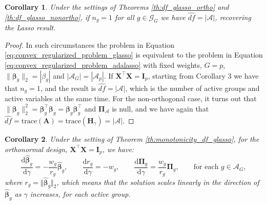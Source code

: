 \documentclass[a4paper, 12pt]{article}
\newcommand{\Aset}{\mathcal{A}}
\newcommand{\betahat}{\widehat{\boldsymbol\beta}}
\newcommand{\trace}{\mathrm{trace}}
\newcommand{\T}{\top}
\def\bbeta{\boldsymbol{\beta}}
\def\bPi{\boldsymbol{\Pi}}
\def\bA{\mathbf{A}}
\def\bH{\mathbf{H}}
\def\bI{\mathbf{I}}
\def\bX{\mathbf{X}}
\newtheorem{corollary}{Corollary}
\begin{document}
\begin{corollary}
\label{coro:group1}
Under the settings of Theorems \ref{th:df_glasso_ortho} and \ref{th:df_glasso_nonortho}, if $n_g=1$ for all $g \in \mathcal{G}_G$ we have $\widehat{df} = |\Aset|$, recovering the Lasso result. 
\end{corollary}
\begin{proof}
In such circumstances the problem in Equation \eqref{eq:convex_regularized_problem_glasso} is equivalent to the problem in Equation \eqref{eq:convex_regularized_problem_adalasso} with fixed weights, $G=p$, $\lVert \bbeta_g \rVert_2 = |\beta_g|$ and $|\Aset_G| = |\Aset_p|$. If $\bX^{\T}\bX=\bI_p$, starting from Corollary 3 we have that $n_g=1$, and the result is $\widehat{df} = \lvert \Aset \rvert$, which is the number of active groups and active variables at the same time. For the non-orthogonal case, it turns out that $\lVert\bbeta_g\rVert_2^2 = \bbeta_g^{\T}\bbeta_g = \bbeta_g \bbeta_g^{\T}$ and $\bPi_\Aset$ is null, and we have again that $\widehat{df} = \trace(\bA) = \trace(\bH_\gamma) = \lvert \Aset \rvert$. 
\end{proof}
%
\begin{corollary}
\label{coro:dbeta_dgamma_orto}
Under the setting of Theorem \ref{th:monotonicity_df_glasso}, for the orthonormal design, $\bX^{\T}\bX=\bI_p$, we have:
\begin{equation*}
\frac{\mathrm{d}\betahat_g}{\mathrm{d}\gamma} = - \frac{w_g}{r_g}  \betahat_g, \qquad  \frac{{\mathrm d}r_{g}}{{\mathrm d} \gamma} = -w_g, \qquad \frac{{\mathrm d}\bPi_{g}}{{\mathrm d} \gamma} = \frac{w_g}{r_g} \bPi_{g} , \qquad \text{for each } g \in \Aset_G,
\end{equation*}
where $r_g= \Vert\betahat_g\Vert_2$, which means that the solution scales linearly in the direction of $\betahat_g$ as $\gamma$ increases, for each active group.
\end{corollary}
\end{document}
